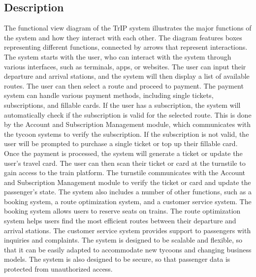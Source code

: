 \subsection{Description}
The functional view diagram of the TrIP system illustrates the major functions of the system and how they interact with each other. The diagram features boxes representing different functions, connected by arrows that represent interactions.
The system starts with the user, who can interact with the system through various interfaces, such as terminals, apps, or websites. The user can input their departure and arrival stations, and the system will then display a list of available routes. The user can then select a route and proceed to payment.
The payment system can handle various payment methods, including single tickets, subscriptions, and fillable cards. If the user has a subscription, the system will automatically check if the subscription is valid for the selected route. This is done by the Account and Subscription Management module, which communicates with the tycoon systems to verify the subscription. If the subscription is not valid, the user will be prompted to purchase a single ticket or top up their fillable card.
Once the payment is processed, the system will generate a ticket or update the user's travel card. The user can then scan their ticket or card at the turnstile to gain access to the train platform. The turnstile communicates with the Account and Subscription Management module to verify the ticket or card and update the passenger's state.
The system also includes a number of other functions, such as a booking system, a route optimization system, and a customer service system. The booking system allows users to reserve seats on trains. The route optimization system helps users find the most efficient routes between their departure and arrival stations. The customer service system provides support to passengers with inquiries and complaints.
The system is designed to be scalable and flexible, so that it can be easily adapted to accommodate new tycoons and changing business models. The system is also designed to be secure, so that passenger data is protected from unauthorized access.

